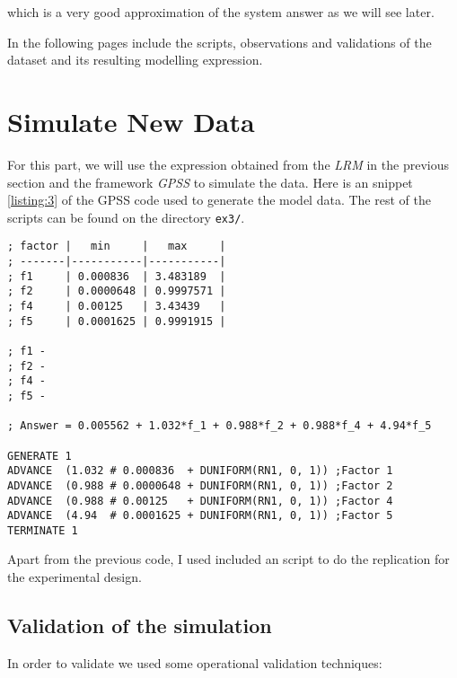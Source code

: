 \documentclass[12pt, a4paper]{article} %
\theoremstyle{definition}
\newcommand{\code}[1]{\texttt{#1}} %
\begin{document}
which is a very good approximation of the system answer as we will see later.

In the following pages include the scripts, observations and validations of the dataset and its resulting modelling expression.




\section{Simulate New Data}

For this part, we will use the expression obtained from the \textit{LRM} in the previous section and the framework \textit{GPSS} to simulate the data. Here is an snippet \ref{listing:3} of the GPSS code used to generate the model data. The rest of the scripts can be found on the directory \code{ex3/}.

\bigbreak

\begin{lstlisting}[caption={GPSS script to simulate data}, captionpos=b]
; factor |   min     |   max     |
; -------|-----------|-----------|
; f1     | 0.000836  | 3.483189  |
; f2     | 0.0000648 | 0.9997571 |
; f4     | 0.00125   | 3.43439   |
; f5     | 0.0001625 | 0.9991915 |

; f1 -
; f2 -
; f4 -
; f5 -

; Answer = 0.005562 + 1.032*f_1 + 0.988*f_2 + 0.988*f_4 + 4.94*f_5

GENERATE 1
ADVANCE  (1.032 # 0.000836  + DUNIFORM(RN1, 0, 1)) ;Factor 1
ADVANCE  (0.988 # 0.0000648 + DUNIFORM(RN1, 0, 1)) ;Factor 2
ADVANCE  (0.988 # 0.00125   + DUNIFORM(RN1, 0, 1)) ;Factor 4
ADVANCE  (4.94  # 0.0001625 + DUNIFORM(RN1, 0, 1)) ;Factor 5
TERMINATE 1
\end{lstlisting}
\label{listing:3}

Apart from the previous code, I used included an script to do the replication for the experimental design.

\subsection{Validation of the simulation}

In order to validate we used some operational validation techniques:\\
\end{document}
